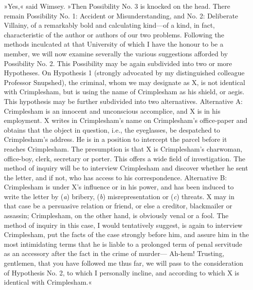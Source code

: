 »Yes,« said Wimsey. »Then Possibility No. 3 is knocked on the head. There remain Possibility No. 1: Accident or Misunderstanding, and No. 2: Deliberate Villainy, of a remarkably bold and calculating kind\allowbreak---\allowbreak of a kind, in fact, characteristic of the author or authors of our two problems. Following the methods inculcated at that University of which I have the honour to be a member, we will now examine severally the various suggestions afforded by Possibility No. 2. This Possibility may be again subdivided into two or more Hypotheses. On Hypothesis 1 (strongly advocated by my distinguished colleague Professor Snupshed), the criminal, whom we may designate as X, is not identical with Crimplesham, but is using the name of Crimplesham as his shield, or aegis. This hypothesis may be further subdivided into two alternatives. Alternative A: Crimplesham is an innocent and unconscious accomplice, and X is in his employment. X writes in Crimplesham's name on Crimplesham's office-paper and obtains that the object in question, i.e., the eyeglasses, be despatched to Crimplesham's address. He is in a position to intercept the parcel before it reaches Crimplesham. The presumption is that X is Crimplesham's charwoman, office-boy, clerk, secretary or porter. This offers a wide field of investigation. The method of inquiry will be to interview Crimplesham and discover whether he sent the letter, and if not, who has access to his correspondence. Alternative B: Crimplesham is under X's influence or in his power, and has been induced to write the letter by (\textit{a}) bribery, (\textit{b}) misrepresentation or (\textit{c}) threats. X may in that case be a persuasive relation or friend, or else a creditor, blackmailer or assassin; Crimplesham, on the other hand, is obviously venal or a fool. The method of inquiry in this case, I would tentatively suggest, is again to interview Crimplesham, put the facts of the case strongly before him, and assure him in the most intimidating terms that he is liable to a prolonged term of penal servitude as an accessory after the fact in the crime of murder--- Ah-hem! Trusting, gentlemen, that you have followed me thus far, we will pass to the consideration of Hypothesis No. 2, to which I personally incline, and according to which X is identical with Crimplesham.«

